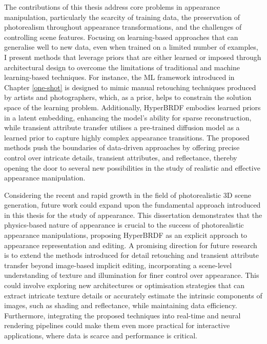 \documentclass[withindex, glossary]{cam-thesis}
\begin{document}
The contributions of this thesis address core problems in appearance manipulation, particularly the scarcity of training data, the preservation of photorealism throughout appearance transformations, and the challenges of controlling scene features. Focusing on learning-based approaches that can generalise well to new data, even when trained on a limited number of examples, I present methods that leverage priors that are either learned or imposed through architectural design to overcome the limitations of traditional and machine learning-based techniques. For instance, the \gls{ML} framework introduced in Chapter \ref{one-shot} is designed to mimic manual retouching techniques produced by artists and photographers, which, as a prior, helps to constrain the solution space of the learning problem. Additionally, HyperBRDF embodies learned priors in a latent embedding, enhancing the model's ability for sparse reconstruction, while transient attribute transfer utilises a pre-trained diffusion model as a learned prior to capture highly complex appearance transitions. The proposed methods push the boundaries of data-driven approaches by offering precise control over intricate details, transient attributes, and reflectance, thereby opening the door to several new possibilities in the study of realistic and effective appearance manipulation.

Considering the recent and rapid growth in the field of photorealistic 3D scene generation, future work could expand upon the fundamental approach introduced in this thesis for the study of appearance. This dissertation demonstrates that the physics-based nature of appearance is crucial to the success of photorealistic appearance manipulations, proposing HyperBRDF as an explicit approach to appearance representation and editing. A promising direction for future research is to extend the methods introduced for detail retouching and transient attribute transfer beyond image-based implicit editing, incorporating a scene-level understanding of texture and illumination for finer control over appearance. This could involve exploring new architectures or optimisation strategies that can extract intricate texture details or accurately estimate the intrinsic components of images, such as shading and reflectance, while maintaining data efficiency. Furthermore, integrating the proposed techniques into real-time and neural rendering pipelines could make them even more practical for interactive applications, where data is scarce and performance is critical.
\end{document}
